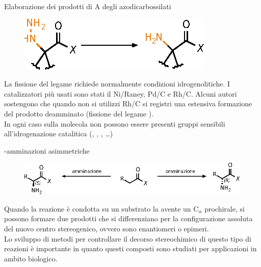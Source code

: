 \documentclass[10pt]{beamer}
\begin{document}
\begin{frame}[fragile]{Elaborazione dei prodotti di {\textalpha}A degli azodicarbossilati}
\begin{figure}[H]  	
	\centering
	\includegraphics[scale=0.7]{P_elaboration2.eps}
\end{figure}  
La fissione del legame  richiede normalmente \alert{condizioni idrogenolitiche}. I catalizzatori più usati sono stati il Ni/Raney, Pd/C e Rh/C. Alcuni autori sostengono che quando non si utilizzi Rh/C si registri una estensiva formazione del prodotto deamminato (fissione del legame ).\\
In ogni caso sulla molecola non possono essere presenti gruppi sensibili all'idrogenazione catalitica (, , , \ldots)

\end{frame}

\begin{frame}[fragile]{{\textalpha}-amminazioni asimmetriche}

\begin{figure}[H]  	
	\centering
	\includegraphics[scale=0.7]{P_enantioelective_amination.eps}
\end{figure}  

Quando la reazione è condotta su un substrato la avente un \alert{C$_{\alpha}$ prochirale}, si possono formare due prodotti che si differenziano per la configurazione assoluta del nuovo centro stereogenico, ovvero sono \alert{enantiomeri o epimeri}.\\
Lo sviluppo di metodi per controllare il \alert{decorso stereochimico} di questo tipo di reazioni è importante in quanto questi composti sono studiati per applicazioni in ambito biologico.
\end{frame}
\end{document}
